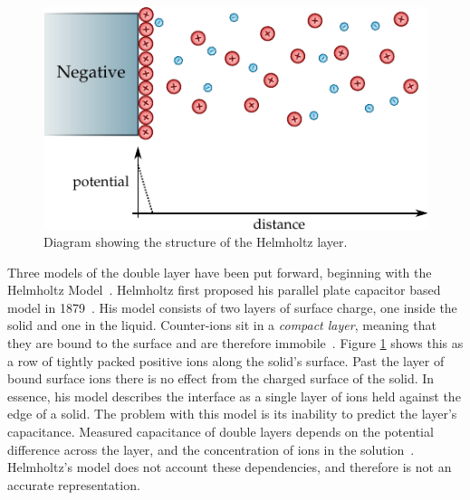    \begin{figure}
      \begin{center}
        \includegraphics{content/introduction/graphics/model_helmholtz}
      \end{center}
      \caption{Diagram showing the structure of the Helmholtz layer.}
      \label{fig:doubleLayerModel_helmholtz}
    \end{figure}
    Three models of the double layer have been put forward, beginning with the Helmholtz Model~\cite{Horch2004}.
    Helmholtz first proposed his parallel plate capacitor based model in 1879~\cite{Geddes1997}.
    His model consists of two layers of surface charge, one inside the solid and one in the liquid.
    Counter-ions sit in a \emph{compact layer}, meaning that they are bound to the surface and are therefore immobile~\cite{Salieb-Beugelaar2009}.
    Figure \ref{fig:doubleLayerModel_helmholtz} shows this as a row of tightly packed positive ions along the solid's surface.
    Past the layer of bound surface ions there is no effect from the charged surface of the solid.
    In essence, his model describes the interface as a single layer of ions held against the edge of a solid.
    The problem with this model is its inability to predict the layer's capacitance.
    Measured capacitance of double layers depends on the potential difference across the layer, and the concentration of ions in the solution~\cite{Bard1980}.
    Helmholtz's model does not account these dependencies, and therefore is not an accurate representation.

